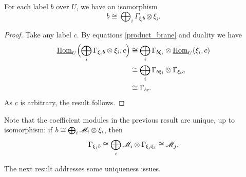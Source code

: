 \begin{cor}\label{linear_comb}
For each label $b$ over $U$, we have an isomorphism
$$b\cong \bigoplus_i\Gamma_{\xi_ib}\otimes \xi_i.$$
\end{cor}
\begin{proof}
Take any label $c$. By equations \eqref{product_brane} and duality we have
$$
\begin{aligned}
\underline{\operatorname{Hom}}_U\Bigl (\bigoplus_i\Gamma_{\xi_ib}\otimes \xi_i,c\Bigr ) &\cong \bigoplus_i\Gamma_{b\xi_i}\otimes \underline{\operatorname{Hom}}_U(\xi_i,c) \\
&\cong \bigoplus_i\Gamma_{b\xi_i}\otimes\Gamma_{\xi_ic} \\
&\cong \Gamma_{bc}.\\
\end{aligned}
$$
As $c$ is arbitrary, the result follows.
\end{proof}

Note that the coefficient modules in the previous result are unique, up to isomorphism: if $b\cong \bigoplus_i\mathscr{M}_i\otimes \xi_i$, then
$$\Gamma_{\xi_jb}\cong \bigoplus_i\mathscr{M}_i\otimes\Gamma_{\xi_j\xi_i}\cong\mathscr{M}_j.$$

The next result addresses some uniqueness issues.

